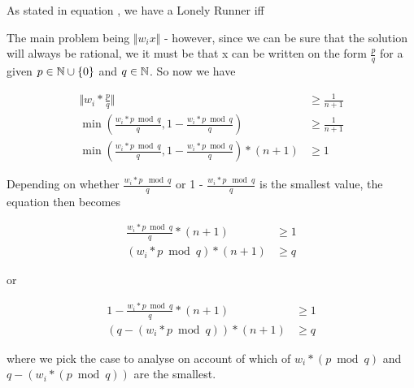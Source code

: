 As stated in equation , we have a Lonely Runner iff

The main problem being $\Vert w_i x\Vert$ - however, since we can be sure that the solution will always be rational, we it must be that x can be written on the form $\frac{p}{q}$ for a given $p \in \mathbb{N}\cup\{0\}$ and $q \in \mathbb{N}$. So now we have

\begin{equation}
\label{compareRewriteOne}
\begin{split}
\Vert w_i * \frac{p}{q}\Vert &\geq \frac{1}{n+1}\\
\min(\frac{w_i * p \bmod q}{q}, 1 - \frac{w_i * p \bmod q}{q}) &\geq \frac{1}{n+1}\\
\min(\frac{w_i * p \bmod q}{q}, 1 - \frac{w_i * p \bmod q}{q}) * (n+1) &\geq 1
\end{split}
\end{equation}

Depending on whether $\frac{w_i * p \mod q}{q}$ or 1 - $\frac{w_i * p \mod q}{q}$ is the smallest value, the equation then becomes

\begin{equation}
\label{compareRewriteTwo}
\begin{split}
\frac{w_i * p \bmod q}{q} * (n+1) &\geq 1\\
(w_i * p \bmod q) * (n+1) &\geq q 
\end{split}
\end{equation}

or 

\begin{equation}
\label{compareRewriteThree}
\begin{split}
1 - \frac{w_i * p \bmod q}{q} * (n+1) &\geq 1\\
(q - (w_i * p \bmod q)) * (n+1) &\geq q
\end{split}
\end{equation}

where we pick the case to analyse on account of which of $w_i * (p \bmod q)$ and $q - (w_i * (p \bmod q))$ are the smallest.

